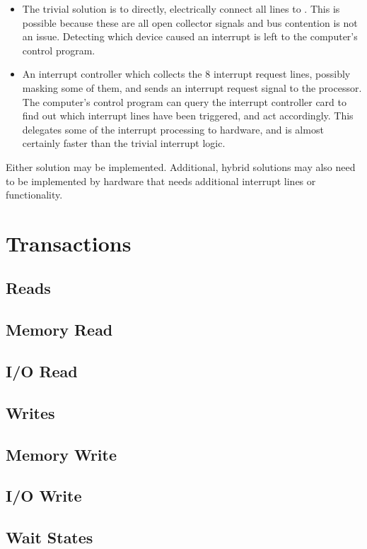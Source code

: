 \begin{itemize}
\item The trivial solution is to directly, electrically connect all
   lines to \IRQ. This is possible because these are all open
  collector signals and bus contention is not an issue. Detecting
  which device caused an interrupt is left to the computer's control
  program.
\item An interrupt controller which collects the 8 interrupt request
  lines, possibly masking some of them, and sends an interrupt request
  signal to the processor. The computer's control program can query
  the interrupt controller card to find out which interrupt lines have
  been triggered, and act accordingly. This delegates some of the
  interrupt processing to hardware, and is almost certainly faster
  than the trivial interrupt logic.
\end{itemize}

Either solution may be implemented. Additional, hybrid solutions may
also need to be implemented by hardware that needs additional
interrupt lines or functionality.

\section{Transactions}

\subsection{Reads}
\subsection{Memory Read}
\subsection{I/O Read}

\subsection{Writes}
\subsection{Memory Write}
\subsection{I/O Write}

\subsection{Wait States}
\label{sec:bus-ws}
